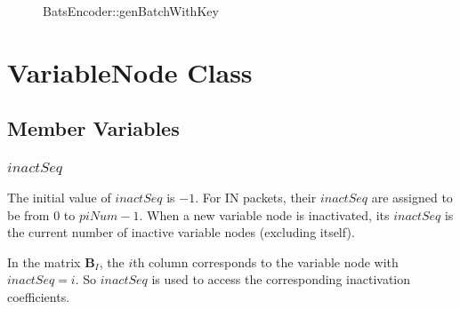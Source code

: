 \documentclass{report}
\begin{document}
\begin{figure}
  \centering

  \caption{BatsEncoder::genBatchWithKey}
  \label{flow:enc:batch}
\end{figure}


\section{VariableNode Class}
\label{sec:varnode}

\subsection{Member Variables}

\subsubsection{$inactSeq$}

The initial value of $inactSeq$ is $-1$. For IN packets, their
$inactSeq$ are assigned to be from $0$ to $piNum-1$.  When a new
variable node is inactivated, its $inactSeq$ is the current number of
inactive variable nodes (excluding itself).

In the matrix $\mathbf{B}_I$, the $i$th column corresponds to the
variable node with $inactSeq = i$. So $inactSeq$ is used to access the
corresponding inactivation coefficients. 
\end{document}
